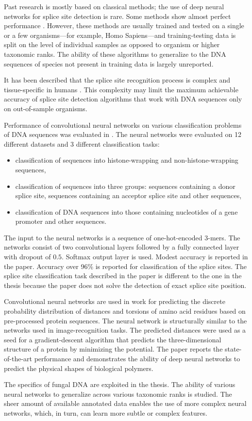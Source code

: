 Past research is mostly based on classical methods; the use of deep neural
networks for splice site detection is rare. Some methods show almost perfect
performance \cite{sarkar2019splice}. However, these methods are usually trained
and tested on a single or a few organisms---for example, Homo Sapiens---and
training-testing data is split on the level of individual samples as opposed to
organism or higher taxonomic ranks. The ability of these algorithms to
generalize to the DNA sequences of species not present in training data is
largely unreported.

It has been described that the splice site recognition process is complex and
tissue-specific in humans \cite{pineda2018most}. This complexity may limit the
maximum achievable accuracy of splice site detection algorithms that work with
DNA sequences only on out-of-sample organisms.

Performance of convolutional neural networks on various classification problems
of DNA sequences was evaluated in \cite{nguyen2016dna}. The neural networks
were evaluated on 12 different datasets and 3 different classification tasks:

\begin{itemize}
 \item classification of sequences into histone-wrapping and
   non-histone-wrapping sequences,
 \item classification of sequences into three groups: sequences containing a
   donor splice site, sequences containing an acceptor splice site and other
   sequences,
 \item classification of DNA sequences into those containing nucleotides of a
   gene promoter and other sequences.
\end{itemize}

The input to the neural networks is a sequence of one-hot-encoded 3-mers. The
networks consist of two convolutional layers followed by a fully connected
layer with dropout of $0.5$. Softmax output layer is used. Modest accuracy is
reported in the paper. Accuracy over 96\% is reported for classification of the
splice sites. The splice site classification task described in the paper is
different to the one in the thesis because the paper does not solve the
detection of exact splice site position.

Convolutional neural networks are used in work \cite{senior2020improved} for
predicting the discrete probability distribution of distances and torsions of
amino acid residues based on pre-processed protein sequences. The neural
network is structurally similar to the networks used in image-recognition
tasks. The predicted distances were used as a seed for a gradient-descent
algorithm that predicts the three-dimensional structure of a protein by
minimizing the potential. The paper reports the state-of-the-art performance
and demonstrates the ability of deep neural networks to predict the physical
shapes of biological polymers.

The specifics of fungal DNA are exploited in the thesis. The ability of various
neural networks to generalize across various taxonomic ranks is studied. The
sheer amount of available annotated data enables the use of more complex neural
networks, which, in turn, can learn more subtle or complex features.
